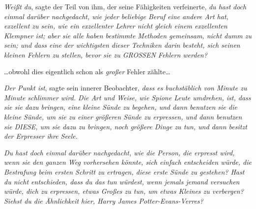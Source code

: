 \emph{Weißt du}, sagte der Teil von ihm, der seine Fähigkeiten verfeinerte, \emph{du hast} \emph{doch} \emph{einmal darüber nachgedacht, wie jeder beliebige Beruf eine andere Art hat, exzellent zu sein, wie ein exzellenter Lehrer nicht gleich einem exzellenten Klempner ist; aber sie alle haben bestimmte Methoden gemeinsam, nicht dumm zu sein; und dass eine der wichtigsten dieser Techniken darin besteht, sich seinen kleinen Fehlern zu stellen, bevor sie zu GROSSEN Fehlern werden?}

…obwohl dies eigentlich schon als \emph{großer} Fehler zählte…

\emph{Der Punkt ist}, sagte sein innerer Beobachter, \emph{dass es buchstäblich von Minute zu Minute schlimmer wird. Die Art und Weise, wie Spione Leute umdrehen, ist, dass sie sie dazu bringen, eine kleine Sünde zu begehen, und dann benutzen sie die kleine Sünde, um sie zu einer größeren Sünde zu erpressen, und dann benutzen sie DIESE, um sie dazu zu bringen, noch größere Dinge zu tun, und dann besitzt der Erpresser ihre Seele.}

\emph{Du hast doch einmal darüber nachgedacht, wie die Person, die erpresst wird, wenn sie den ganzen Weg vorhersehen könnte, sich einfach entscheiden würde, die Bestrafung beim ersten Schritt zu ertragen, diese erste Sünde zu gestehen? Hast du nicht entschieden, dass du das tun würdest, wenn jemals jemand versuchen würde, dich zu erpressen, etwas Großes zu tun, um etwas Kleines zu verbergen? Siehst du die Ähnlichkeit hier, Harry James Potter-Evans-Verres?}

